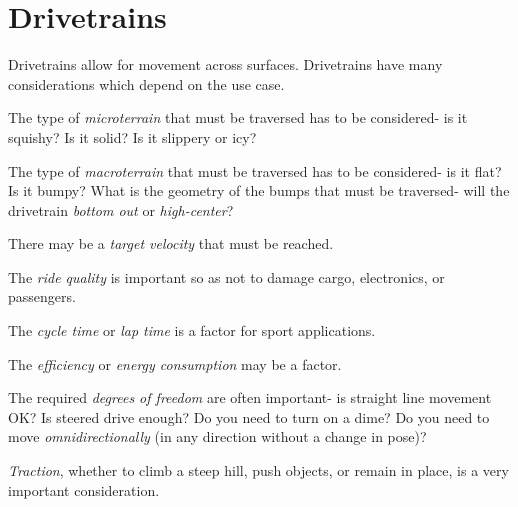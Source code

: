 
\section{Drivetrains} \label{section:drivetrains}
Drivetrains allow for movement across surfaces. Drivetrains have many considerations which depend on the use case.
\begin{asparaenum}[a)]
\item The type of \textit{microterrain} that must be traversed has to be considered- is it squishy? Is it solid? Is it slippery or icy? 
\item The type of \textit{macroterrain} that must be traversed has to be considered- is it flat? Is it bumpy? What is the geometry of the bumps that must be traversed- will the drivetrain \textit{bottom out} or \textit{high-center}?
\item There may be a \textit{target velocity} that must be reached.
\item The \textit{ride quality} is important so as not to damage cargo, electronics, or passengers.
\item The \textit{cycle time} or \textit{lap time} is a factor for sport applications.
\item The \textit{efficiency} or \textit{energy consumption} may be a factor.
\item The required \textit{degrees of freedom} are often important- is straight line movement OK? Is steered drive enough? Do you need to turn on a dime? Do you need to move \textit{omnidirectionally} (in any direction without a change in pose)?
\item \textit{Traction}, whether to climb a steep hill, push objects, or remain in place, is a very important consideration.
\end{asparaenum}
